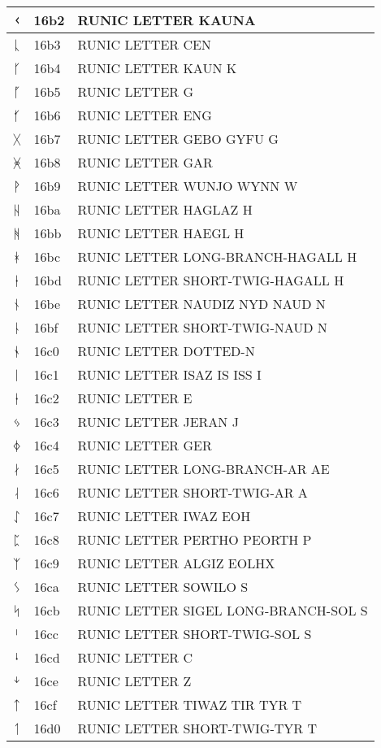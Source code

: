 \documentclass[12pt,letterpaper,openany]{book}
\begin{document}
\begin{center}
\begin{supertabular}{|m{0.25in}|m{0.5in}|m{4in}|}
			ᚲ & 16b2 & RUNIC LETTER KAUNA\\\hline
			ᚳ & 16b3 & RUNIC LETTER CEN\\\hline
			ᚴ & 16b4 & RUNIC LETTER KAUN K\\\hline
			ᚵ & 16b5 & RUNIC LETTER G\\\hline
			ᚶ & 16b6 & RUNIC LETTER ENG\\\hline
			ᚷ & 16b7 & RUNIC LETTER GEBO GYFU G\\\hline
			ᚸ & 16b8 & RUNIC LETTER GAR\\\hline
			ᚹ & 16b9 & RUNIC LETTER WUNJO WYNN W\\\hline
			ᚺ & 16ba & RUNIC LETTER HAGLAZ H\\\hline
			ᚻ & 16bb & RUNIC LETTER HAEGL H\\\hline
			ᚼ & 16bc & RUNIC LETTER LONG-BRANCH-HAGALL H\\\hline
			ᚽ & 16bd & RUNIC LETTER SHORT-TWIG-HAGALL H\\\hline
			ᚾ & 16be & RUNIC LETTER NAUDIZ NYD NAUD N\\\hline
			ᚿ & 16bf & RUNIC LETTER SHORT-TWIG-NAUD N\\\hline
			ᛀ & 16c0 & RUNIC LETTER DOTTED-N\\\hline
			ᛁ & 16c1 & RUNIC LETTER ISAZ IS ISS I\\\hline
			ᛂ & 16c2 & RUNIC LETTER E\\\hline
			ᛃ & 16c3 & RUNIC LETTER JERAN J\\\hline
			ᛄ & 16c4 & RUNIC LETTER GER\\\hline
			ᛅ & 16c5 & RUNIC LETTER LONG-BRANCH-AR AE\\\hline
			ᛆ & 16c6 & RUNIC LETTER SHORT-TWIG-AR A\\\hline
			ᛇ & 16c7 & RUNIC LETTER IWAZ EOH\\\hline
			ᛈ & 16c8 & RUNIC LETTER PERTHO PEORTH P\\\hline
			ᛉ & 16c9 & RUNIC LETTER ALGIZ EOLHX\\\hline
			ᛊ & 16ca & RUNIC LETTER SOWILO S\\\hline
			ᛋ & 16cb & RUNIC LETTER SIGEL LONG-BRANCH-SOL S\\\hline
			ᛌ & 16cc & RUNIC LETTER SHORT-TWIG-SOL S\\\hline
			ᛍ & 16cd & RUNIC LETTER C\\\hline
			ᛎ & 16ce & RUNIC LETTER Z\\\hline
			ᛏ & 16cf & RUNIC LETTER TIWAZ TIR TYR T\\\hline
			ᛐ & 16d0 & RUNIC LETTER SHORT-TWIG-TYR T\\\hline

\end{supertabular}
\end{center}
\end{document}
